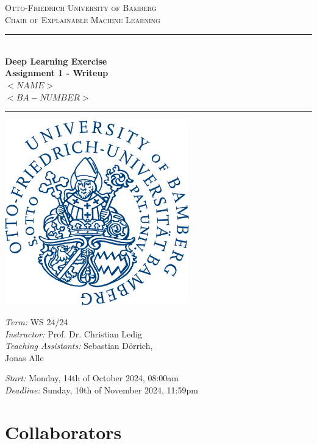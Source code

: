 \documentclass[12pt,twoside]{article}
\begin{document}
\begin{titlepage}

\newcommand{\HRule}{\rule{\linewidth}{0.5mm}} %
\newcommand{\hRule}{\rule{0.6\linewidth}{0.25mm}} %

\begin{center} %
    \textsc{\Large Otto-Friedrich University of Bamberg}\\[0.5cm] 
    \textsc{\large Chair of Explainable Machine Learning}\\[1.5cm] 

    \HRule \\[0.4cm]
    {\huge \bfseries Deep Learning Exercise}\\[0.5cm] 
    {\LARGE \bfseries Assignment 1 - Writeup}\\[0.5cm]
    {\large \bfseries $<NAME>$}\\[0.5cm] %
    {\large \bfseries $<BA-NUMBER>$} %
    \HRule
    
\end{center}

\vfill

\begin{center}
    \includegraphics[width = 8cm]{img/uni_bamberg_logo.pdf}
\end{center}

\vfill
\begin{flushleft} \large
    \textit{Term:} WS 24/24 \\
    \textit{Instructor:} Prof. Dr. Christian Ledig \\
    \textit{Teaching Assistants:} Sebastian Dörrich, \\
     Jonas Alle
    
    \vspace{0.5cm}
    
    \textit{Start:} Monday, 14th of October 2024, 08:00am\\
    \textit{Deadline:} Sunday, 10th of November 2024, 11:59pm
    
\end{flushleft}
\vfill %

\end{titlepage}

\section*{Collaborators}

\newpage
\end{document}

